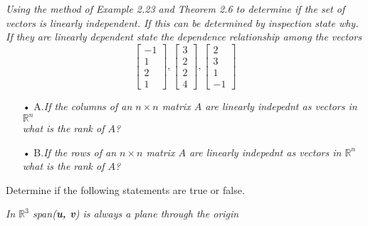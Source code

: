 \documentclass[11pt,letterpaper,boxed]{hmcpset}
\begin{document}
\begin{problem}[2.3.28]
\textit{Using the method of Example 2.23 and Theorem 2.6 to determine if the set of vectors is linearly independent. If this can be determined by inspection state why. If they are linearly dependent state the dependence relationship among the vectors}
$$\begin{bmatrix}
-1\\1\\2\\1
\end{bmatrix} \phantom{	},
\begin{bmatrix}
3\\2\\2\\4
\end{bmatrix} \phantom{	},
\begin{bmatrix}
2\\3\\1\\-1
\end{bmatrix} \phantom{	}
$$
\end{problem}



\pagebreak

\begin{problem}[2.3.42]
\begin{enumerate}
\item[•]
A.\textit{If the columns of an $n\times n$ matrix $A$ are linearly indepednt as vectors in $\mathbb{R}^n$\\ \indent \phantom{phantom} what is the rank of $A$?}
\item[•]
\indent B.\textit{If the rows of an $n\times n$ matrix $A$ are linearly indepednt as vectors in $\mathbb{R}^n$\\ \indent \phantom{phantom} what is the rank of $A$?}
\end{enumerate}
\end{problem}




\pagebreak
{}
\begin{center}
Determine if the following statements are true or false. 
\end{center}
\begin{problem}[Ch 2.1f]
\textit{In $\mathbb{R}^3$ span(\textbf{u, v}) is always a plane through the origin} 
\end{problem}
\end{document}
